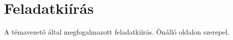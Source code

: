\chapter*{Feladatkiírás}

A témavezetõ által megfogalmazott feladatkiírás. Önálló oldalon szerepel.
